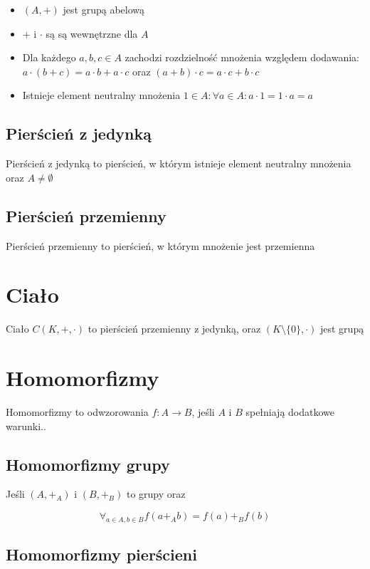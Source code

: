\documentclass{../notatki}
\begin{document}
\begin{itemize}
    \item $(A, +)$ jest grupą abelową
    \item $+$ i $\cdot$ są są wewnętrzne dla $A$
    \item Dla każdego $a, b, c \in A$ zachodzi rozdzielność mnożenia względem dodawania: $a \cdot (b + c) = a \cdot b + a \cdot c$ oraz $(a + b) \cdot c = a \cdot c + b \cdot c$
    \item Istnieje element neutralny mnożenia $1 \in A: \forall a \in A: a \cdot 1 = 1 \cdot a = a$
\end{itemize}

\subsection{Pierścień z jedynką}

Pierścień z jedynką to pierścień, w którym istnieje element neutralny mnożenia oraz $A \ne \emptyset$

\subsection{Pierścień przemienny}

Pierścień przemienny to pierścień, w którym mnożenie jest przemienna

\section{Ciało}

Ciało $C(K, +, \cdot)$ to pierścień przemienny z jedynką, oraz $(K \setminus \{0\}, \cdot)$ jest grupą

\section{Homomorfizmy}

Homomorfizmy to odwzorowania $f: A \rightarrow B$, jeśli $A$ i $B$ spełniają dodatkowe warunki..

\subsection{Homomorfizmy grupy}

Jeśli $(A, +_A)$ i $(B, +_B)$ to grupy oraz 

$$
\forall_{a \in A, b \in B} f(a +_A b) = f(a) +_B f(b) 
$$

\subsection{Homomorfizmy pierścieni}
\end{document}
